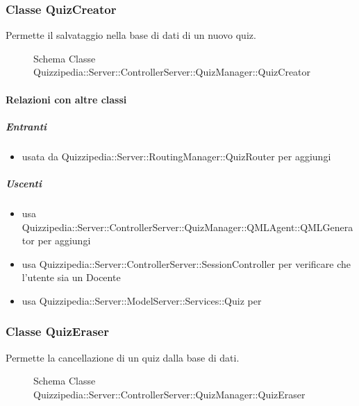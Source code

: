 \subsubsection{Classe QuizCreator}
Permette il salvataggio nella base di dati di un nuovo quiz.
\begin{figure}[H]
\centering
\noindent{}
\caption[Schema Classe QuizCreator]{Schema Classe Quizzipedia::Server::ControllerServer::QuizManager::QuizCreator}
\end{figure}
\paragraph{Relazioni con altre classi}
\subparagraph{Entranti}
\begin{itemize}
\item usata da Quizzipedia::Server::RoutingManager::QuizRouter per aggiungi
\end{itemize}
\subparagraph{Uscenti}
\begin{itemize}
\item usa Quizzipedia::Server::ControllerServer::QuizManager::QMLAgent::QMLGenerator per aggiungi
\item usa Quizzipedia::Server::ControllerServer::SessionController per verificare che l'utente sia un Docente
\item usa Quizzipedia::Server::ModelServer::Services::Quiz per 
\end{itemize}
\subsubsection{Classe QuizEraser}
Permette la cancellazione di un quiz dalla base di dati.
\begin{figure}[H]
\centering
\noindent{}
\caption[Schema Classe QuizEraser]{Schema Classe Quizzipedia::Server::ControllerServer::QuizManager::QuizEraser}
\end{figure}
